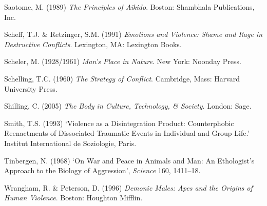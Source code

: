 \begin{list}{}{}
\item Saotome, M. (1989) \emph{The Principles of Aikido}. Boston: Shambhala Publications, Inc.
\item Scheff, T.J. \& Retzinger, S.M. (1991) \emph{Emotions and Violence: Shame and Rage in Destructive Conflicts}. Lexington, MA: Lexington Books.
\item Scheler, M. (1928/1961) \emph{Man's Place in Nature}. New York: Noonday Press.
\item Schelling, T.C. (1960) \emph{The Strategy of Conflict}. Cambridge, Mass: Harvard University Press.
\item Shilling, C. (2005) \emph{The Body in Culture, Technology, \& Society}. London: Sage.
\item Smith, T.S. (1993) `Violence as a Disintegration Product: Counterphobic Reenactments of Dissociated Traumatic Events in Individual and Group Life.' Institut International de Soziologie, Paris.
\item Tinbergen, N. (1968) `On War and Peace in Animals and Man: An Ethologist's Approach to the Biology of Aggression', \emph{Science} 160, 1411--18.
\item Wrangham, R. \& Peterson, D. (1996) \emph{Demonic Males: Apes and the Origins of Human Violence}. Boston: Houghton Mifflin.
\end{list}